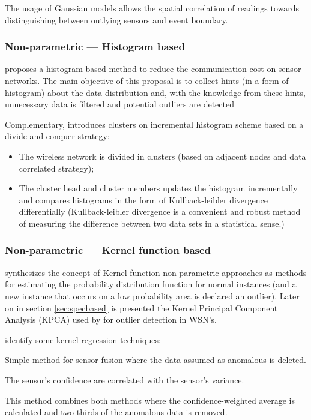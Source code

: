 The usage of Gaussian  models allows the spatial correlation of readings towards distinguishing between outlying sensors and event boundary. 

\subsubsection{Non-parametric --- Histogram based}
\cite{stat:sheng:2007} proposes a histogram-based method to reduce the communication cost on sensor networks. The main objective of this proposal is to collect hints (in a form of histogram) about the data distribution and, with the knowledge from these hints, unnecessary data is filtered and potential outliers are detected 


Complementary, \cite{stat:wang:2013} introduces clusters on incremental histogram scheme based on a divide and conquer strategy:

\begin{itemize}
	\setlength\itemsep{-0.5em}
	\item The wireless network is divided in clusters (based on adjacent nodes and data correlated strategy);
	\item The cluster head and cluster members updates the histogram incrementally and compares histograms in the form of Kullback-leibler divergence differentially (Kullback-leibler divergence is a convenient and robust
	method of measuring the difference between two data sets in a
	statistical sense.)
\end{itemize}

\subsubsection{Non-parametric --- Kernel function based}
\cite{gen:zhang:2010} synthesizes the concept of Kernel function non-parametric approaches as methods for estimating the probability distribution function for normal instances (and a new instance that occurs on a low probability area is declared an outlier). Later on in section \ref{sec:specbased} is presented the Kernel Principal Component Analysis (KPCA) used by \cite{stat:ghorbel:2014} for outlier detection in WSN's.

\cite{cluster:andrade2016} identify some kernel regression techniques: 

\begin{description}
	\setlength\itemsep{-0.5em}
	\item[Marzullo's Fault Tolerant Sensor Averaging (FTA) ] 
	Simple method for sensor fusion where the data assumed as anomalous is deleted.
	\item[Elmenreich's Confidence-Weighted Averaging (CWA) ] 
	The sensor's confidence are correlated with the sensor's variance.
	\item[CWA+FTA method ]
	This method combines both methods where the confidence-weighted average is calculated and two-thirds of the anomalous data is removed.
\end{description}


